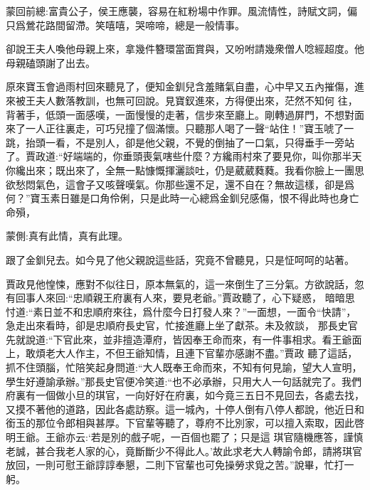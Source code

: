 

\begin{parag}
    \begin{note}蒙回前總:富貴公子，侯王應襲，容易在紅粉場中作罪。風流情性，詩賦文詞，偏只爲鶯花路間留滯。笑嘻嘻，哭啼啼，總是一般情事。\end{note}
\end{parag}


\begin{parag}
    卻說王夫人喚他母親上來，拿幾件簪環當面賞與，又吩咐請幾衆僧人唸經超度。他母親磕頭謝了出去。
\end{parag}


\begin{parag}
    原來寶玉會過雨村回來聽見了，便知金釧兒含羞賭氣自盡，心中早又五內摧傷，進來被王夫人數落教訓，也無可回說。見寶釵進來，方得便出來，茫然不知何 往，背著手，低頭一面感嘆，一面慢慢的走著，信步來至廳上。剛轉過屏門，不想對面來了一人正往裏走，可巧兒撞了個滿懷。只聽那人喝了一聲“站住！”寶玉唬了一跳，抬頭一看，不是別人，卻是他父親，不覺的倒抽了一口氣，只得垂手一旁站了。賈政道:“好端端的，你垂頭喪氣嗐些什麼？方纔雨村來了要見你，叫你那半天你纔出來；既出來了，全無一點慷慨揮灑談吐，仍是葳葳蕤蕤。我看你臉上一團思欲愁悶氣色，這會子又咳聲嘆氣。你那些還不足，還不自在？無故這樣，卻是爲何？”寶玉素日雖是口角伶俐，只是此時一心總爲金釧兒感傷，恨不得此時也身亡命殞，\begin{note}蒙側:真有此情，真有此理。\end{note}跟了金釧兒去。如今見了他父親說這些話，究竟不曾聽見，只是怔呵呵的站著。
\end{parag}


\begin{parag}
    賈政見他惶悚，應對不似往日，原本無氣的，這一來倒生了三分氣。方欲說話，忽有回事人來回:“忠順親王府裏有人來，要見老爺。”賈政聽了，心下疑惑， 暗暗思忖道:“素日並不和忠順府來往，爲什麼今日打發人來？”一面想，一面令“快請”，急走出來看時，卻是忠順府長史官，忙接進廳上坐了獻茶。未及敘談， 那長史官先就說道:“下官此來，並非擅造潭府，皆因奉王命而來，有一件事相求。看王爺面上，敢煩老大人作主，不但王爺知情，且連下官輩亦感謝不盡。”賈政 聽了這話，抓不住頭腦，忙陪笑起身問道:“大人既奉王命而來，不知有何見諭，望大人宣明，學生好遵諭承辦。”那長史官便冷笑道:“也不必承辦，只用大人一句話就完了。我們府裏有一個做小旦的琪官，一向好好在府裏，如今竟三五日不見回去，各處去找，又摸不著他的道路，因此各處訪察。這一城內，十停人倒有八停人都說，他近日和銜玉的那位令郎相與甚厚。下官輩等聽了，尊府不比別家，可以擅入索取，因此啓明王爺。王爺亦云:‘若是別的戲子呢，一百個也罷了；只是這 琪官隨機應答，謹慎老誠，甚合我老人家的心，竟斷斷少不得此人。’故此求老大人轉諭令郎，請將琪官放回，一則可慰王爺諄諄奉懇，二則下官輩也可免操勞求覓之苦。”說畢，忙打一躬。
\end{parag}


